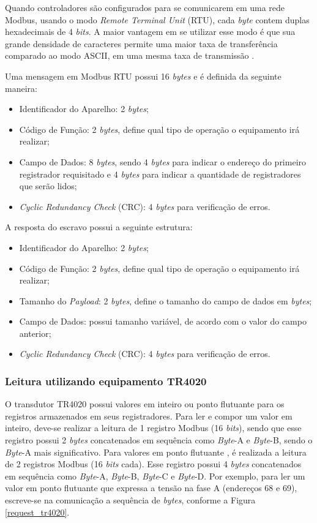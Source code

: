     Quando controladores são configurados para se comunicarem em uma rede Modbus, usando o modo \textit{Remote Terminal Unit} (RTU), cada \textit{byte} contem duplas hexadecimais de 4 \textit{bits}. A maior vantagem em se utilizar esse modo é que sua grande densidade de caracteres permite uma maior taxa de transferência comparado ao modo ASCII, em uma mesma taxa de transmissão \cite{modbus}.

    Uma mensagem em Modbus RTU possui 16 \textit{bytes} e é definida da seguinte maneira:
    \begin{itemize}
        \item Identificador do Aparelho: 2 \textit{bytes};
        \item Código de Função: 2 \textit{bytes}, define qual tipo de operação o equipamento irá realizar;
        \item Campo de Dados: 8 \textit{bytes}, sendo 4 \textit{bytes} para indicar o endereço do primeiro registrador requisitado e 4 \textit{bytes} para indicar a quantidade de registradores que serão lidos;
        \item \textit{Cyclic Redundancy Check} (CRC): 4 \textit{bytes} para verificação de erros.
    \end{itemize}

    A resposta do escravo possui a seguinte estrutura:

    \begin{itemize}
        \item Identificador do Aparelho: 2 \textit{bytes};
        \item Código de Função: 2 \textit{bytes}, define qual tipo de operação o equipamento irá realizar;
        \item Tamanho do \textit{Payload}: 2 \textit{bytes}, define o tamanho do campo de dados em \textit{bytes};
        \item Campo de Dados: possui tamanho variável, de acordo com o valor do campo anterior;
        \item \textit{Cyclic Redundancy Check} (CRC): 4 \textit{bytes} para verificação de erros.
    \end{itemize}

    \subsubsection{Leitura utilizando equipamento TR4020}
    O transdutor TR4020 possui valores em inteiro ou ponto flutuante para os registros armazenados em seus registradores. Para ler e compor um valor em inteiro, deve-se realizar a leitura de 1 registro Modbus (16 \textit{bits}), sendo que esse registro possui 2 \textit{bytes} concatenados em sequência como \textit{Byte}-A e \textit{Byte}-B, sendo o \textit{Byte}-A mais significativo. Para valores em ponto flutuante \cite{ieee754}, é realizada a leitura de 2 registros Modbus (16 \textit{bits} cada). Esse registro possui 4 \textit{bytes} concatenados em sequência como \textit{Byte}-A, \textit{Byte}-B, \textit{Byte}-C e \textit{Byte}-D. Por exemplo, para ler um valor em ponto flutuante que expressa a tensão na fase A (endereços 68 e 69), escreve-se na comunicação a sequência de \textit{bytes}, conforme a Figura \ref{request_tr4020}.

